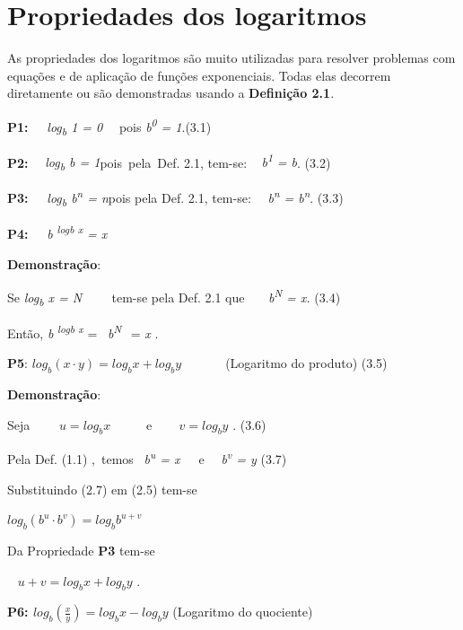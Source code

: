 \section{Propriedades dos logaritmos}

As propriedades dos logaritmos são muito utilizadas para resolver problemas com equações e de aplicação de funções exponenciais. Todas elas decorrem diretamente ou são demonstradas usando a \textbf{Definição 2.1}.

\textbf{P1:~~ }\textit{log\textsubscript{b} 1 = 0}~~ \quad pois \textit{b\textsuperscript{0} = 1}.\quad \quad \quad \quad \quad \quad \quad (3.1)

\textbf{P2:}~~ \textit{log\textsubscript{b} b = 1}\quad pois~pela~Def. 2.1, tem-se:   ~ \textit{b\textsuperscript{1} = b}. \quad \quad \quad \quad \quad \quad \quad (3.2)

\textbf{P3:~~ }\textit{log\textsubscript{b} b\textsuperscript{n} = n}\quad pois pela Def. 2.1, tem-se:~~ \textit{b\textsuperscript{n} = b\textsuperscript{n}}. \quad \quad \quad \quad (3.3)

\textbf{P4:~~ }\textit{b}\textbf{ }\textit{\textsuperscript{logb x} = x\quad }

\textbf{Demonstração}: 

Se \textit{log\textsubscript{b} x = N~~~~ }tem-se pela Def. 2.1 que\textit{~~~ b\textsuperscript{N }= x. \quad \quad \quad \quad }(3.4)

Então, \textit{ }  \textit{b}\textbf{ }\textit{\textsuperscript{logb x}}  =~ \textit{b\textsuperscript{N~ }}= \textit{ x }.

\textbf{P5}: \(  log_{b} \left( x \cdot y \right) =log_{b}x+log_{b}y \) ~~~ ~~ (Logaritmo do produto) \quad \quad \quad (3.5)

\textbf{Demonstração}: 

Seja~~~~  \( u=log_{b}x \) ~~~~~e~~  ~  \( v=log_{b}y \) . \quad \quad \quad \quad \quad (3.6)

Pela Def. (1.1) ,~temos~  \textit{b\textsuperscript{u} = x}~~~e~~  \textit{b\textsuperscript{v} = y } \quad \quad \quad \quad \quad (3.7)

Substituindo (2.7) em (2.5) tem-se 

\quad  \( log_{b} \left( b^{u} \cdot b^{v} \right) =log_{b}b^{u+v} \) 

Da Propriedade \textbf{P3} tem-se

~ \quad  \( u+v=log_{b}x+log_{b}y \) .

\textbf{P6:  \( log_{b} \left( \frac{x}{y} \right) =log_{b}x-log_{b}y \) }\quad (Logaritmo do quociente)

